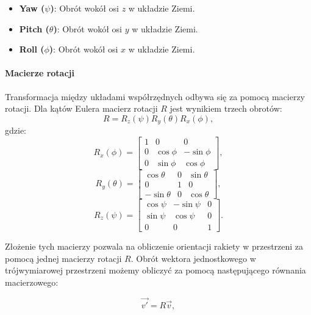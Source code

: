 \begin{itemize}
    \item \textbf{Yaw ($\psi$)}: Obrót wokół osi $z$ w układzie Ziemi.
    \item \textbf{Pitch ($\theta$)}: Obrót wokół osi $y$ w układzie Ziemi.
    \item \textbf{Roll ($\phi$)}: Obrót wokół osi $x$ w układzie Ziemi.
\end{itemize}

\paragraph{Macierze rotacji}
Transformacja między układami współrzędnych odbywa się za pomocą macierzy rotacji. Dla kątów Eulera macierz rotacji $R$ jest wynikiem trzech obrotów:
\begin{equation}
R = R_z(\psi) R_y(\theta) R_x(\phi),
\label{eq:rotation_matrix}
\end{equation}
gdzie:
\begin{equation}
    R_x(\phi) =
\begin{bmatrix}
1 & 0 & 0 \\
0 & \cos\phi & -\sin\phi \\
0 & \sin\phi & \cos\phi
\end{bmatrix},
    \label{eq:rotation_x}
\end{equation}
\begin{equation}
    R_y(\theta) =
\begin{bmatrix}
\cos\theta & 0 & \sin\theta \\
0 & 1 & 0 \\
-\sin\theta & 0 & \cos\theta
\end{bmatrix},
    \label{eq:rotation_y}
\end{equation}
\begin{equation}
    R_z(\psi) =
\begin{bmatrix}
\cos\psi & -\sin\psi & 0 \\
\sin\psi & \cos\psi & 0 \\
0 & 0 & 1
\end{bmatrix}.
    \label{eq:rotation_z}
\end{equation}

Złożenie tych macierzy pozwala na obliczenie orientacji rakiety w
przestrzeni za pomocą jednej macierzy rotacji $R$. Obrót wektora
jednostkowego w trójwymiarowej przestrzeni możemy obliczyć za pomocą
następującego równania macierzowego:

\begin{equation}
\vec{v'} = R \vec{v},
\label{eq:rotation_vector}
\end{equation}


